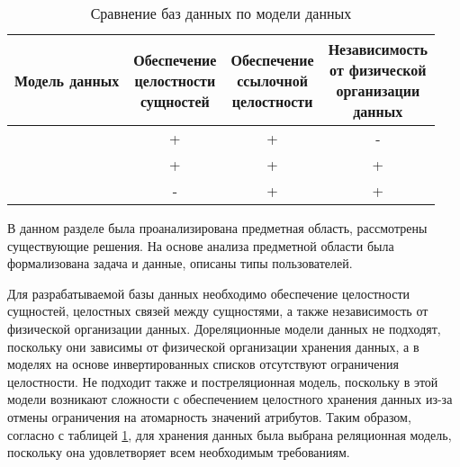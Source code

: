 \begin{table}[ht]
	\begin{center}
		\begin{threeparttable}
			\caption{Сравнение баз данных по модели данных}
			\label{tbl:cmpDbByDataModel}
			\begin{tabular}{|c|c|c|c|}
				\hline
				Модель данных & \makecell{Обеспечение \\ целостности \\ сущностей} & \makecell{Обеспечение \\ ссылочной \\ целостности} & \makecell{Независимость \\ от физической \\ организации \\ данных} \\
				\hline
				\makecell{Дореляционная} & + & + & -  \\
				\hline
				\makecell{Реляционная} & + & + & + \\
				\hline
				\makecell{Постреляционная} & - & + & + \\
				\hline
			\end{tabular}
		\end{threeparttable}			
	\end{center}
\end{table}


В данном разделе была проанализирована предметная область, рассмотрены существующие решения. На основе анализа предметной области была формализована задача и данные, описаны типы пользователей. 

Для разрабатываемой базы данных необходимо обеспечение целостности сущностей, целостных связей между сущностями, а также независимость от физической организации данных. Дореляционные модели данных не подходят, поскольку они зависимы от физической организации хранения данных, а в моделях на основе инвертированных списков отсутствуют ограничения целостности. Не подходит также и постреляционная модель, поскольку в этой модели возникают сложности с обеспечением целостного хранения данных из-за отмены ограничения на атомарность значений атрибутов. Таким образом, согласно с таблицей \ref{tbl:cmpDbByDataModel}, для хранения данных была выбрана реляционная модель, поскольку она удовлетворяет всем необходимым требованиям.
